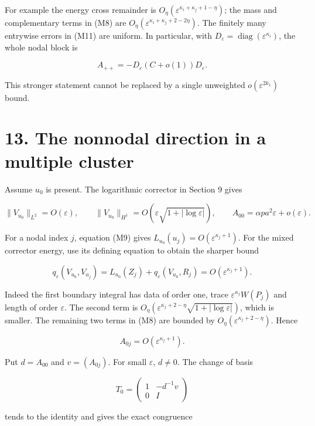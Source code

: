 \documentclass[11pt]{article}
\begin{document}
For example the energy cross remainder is
\(O_\eta(\varepsilon^{\kappa_i+\kappa_j+1-\eta})\); the mass and
complementary terms in (M8) are
\(O_\eta(\varepsilon^{\kappa_i+\kappa_j+2-2\eta})\). The finitely many
entrywise errors in (M11) are uniform. In particular, with
\(D_\varepsilon=\operatorname{diag}(\varepsilon^{\kappa_i})\), the whole
nodal block is

\[
 A_{++}=-D_\varepsilon(C+o(1))D_\varepsilon.
 \tag{M12}
\]

This stronger statement cannot be replaced by a single unweighted
\(o(\varepsilon^{2k_1})\) bound.

\section{13. The nonnodal direction in a multiple
cluster}\label{the-nonnodal-direction-in-a-multiple-cluster}

Assume \(u_0\) is present. The logarithmic corrector in Section 9 gives

\[
 \|V_{u_0}\|_{L^2}=O(\varepsilon),\qquad
 \|V_{u_0}\|_{H^1}=O(\varepsilon\sqrt{1+|\log\varepsilon|}),
 \qquad A_{00}=\alpha p a^2\varepsilon+o(\varepsilon).
 \tag{M13}
\]

For a nodal index \(j\), equation (M9) gives
\(L_{u_0}(u_j)=O(\varepsilon^{\kappa_j+1})\). For the mixed corrector
energy, use its defining equation to obtain the sharper bound

\[
 q_\varepsilon(V_{u_0},V_{u_j})
 =L_{u_0}(Z_j)+q_\varepsilon(V_{u_0},R_j)
 =O(\varepsilon^{\kappa_j+1}).
 \tag{M14}
\]

Indeed the first boundary integral has data of order one, trace
\(\varepsilon^{\kappa_j}W(P_j)\) and length of order \(\varepsilon\).
The second term is
\(O_\eta(\varepsilon^{\kappa_j+2-\eta}\sqrt{1+|\log\varepsilon|})\),
which is smaller. The remaining two terms in (M8) are bounded by
\(O_\eta(\varepsilon^{\kappa_j+2-\eta})\). Hence

\[
 A_{0j}=O(\varepsilon^{\kappa_j+1}).
 \tag{M15}
\]

Put \(d=A_{00}\) and \(v=(A_{0j})\). For small \(\varepsilon\),
\(d\ne0\). The change of basis

\[
 T_0=\begin{pmatrix}1&-d^{-1}v\\0&I\end{pmatrix}
\]

tends to the identity and gives the exact congruence
\end{document}

